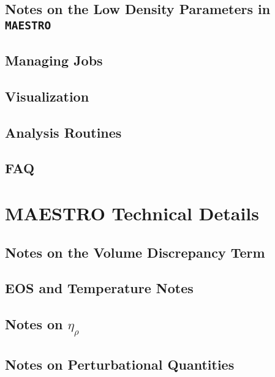 \documentclass[11pt]{book}
\newcommand{\etarho}{\eta_{\rho}}
\begin{document}
\chapter{Notes on the Low Density Parameters in {\tt MAESTRO}}


\chapter{Managing Jobs}


\chapter{Visualization}


\chapter{Analysis Routines}


\chapter{FAQ}


\part{MAESTRO Technical Details}

\chapter{Notes on the Volume Discrepancy Term}


\chapter{EOS and Temperature Notes}


\chapter{Notes on $\etarho$}


\chapter{Notes on Perturbational Quantities}

\end{document}
